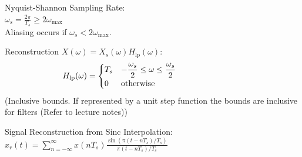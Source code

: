 \documentclass[12pt,landscape,letterpaper]{article}
\newcommand{\tab}{\hspace{0.02\textwidth}}
\newcommand{\ds}{\displaystyle}
\begin{document}
\begin{multicols*}{3}
Nyquist-Shannon Sampling Rate:\\
\tab $\omega_s = \frac{2\pi}{T_s} \geq 2\omega_\text{max}$\\
\tab Aliasing occurs if $\omega_s < 2\omega_\text{max}$.

Reconstruction $X(\omega)=X_s(\omega)H_\text{lp}(\omega)$:
\vspace{-1em}
\begin{equation*}
\hspace{-8em}
H_{\text{lp}}(\omega) =
\begin{cases}
T_s & \ds -\frac{\omega_s}{2} \leq \omega \leq \frac{\omega_s}{2}\\
0 & \text{otherwise}
\end{cases}
\end{equation*}
\tab (Inclusive bounds. If represented by a unit step function the bounds are inclusive for filters (Refer to lecture notes))

Signal Reconstruction from Sinc Interpolation:\\
\tab $\ds x_r(t) = \sum_{n=-\infty}^{\infty} x(nT_s) \frac{\sin(\pi(t-nT_s)/T_s)}{\pi(t-nT_s)/T_s}$
\end{multicols*}

\newpage
\end{document}
